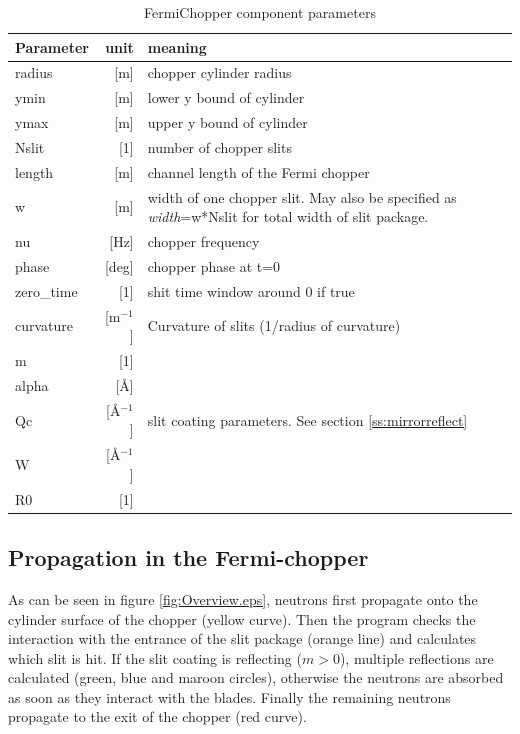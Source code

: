 \begin{table}
  \begin{center}
  {\let\my=\\
    \begin{tabular}{|lr|p{}|}
    \hline
Parameter & unit & meaning \\
    \hline
radius & [m] & chopper cylinder radius \\
ymin   & [m] &   lower y bound of cylinder \\
ymax   & [m] &   upper y bound of cylinder \\
Nslit  & [1] &   number of chopper slits \\
length & [m] &   channel length of the Fermi chopper \\
w      & [m] &   width of one chopper slit. May also be specified as \emph{width}=w*Nslit for total width of slit package. \\
nu & [Hz] &  chopper frequency \\
phase     & [deg] &   chopper phase at t=0 \\
zero\_time & [1] & shit time window around 0 if true \\
curvature & [m$^{-1}$] & Curvature of slits (1/radius of curvature) \\
    \hline
m     & [1] & \\
alpha & [\AA] & \\
Qc    & [\AA$^{-1}$] & slit coating parameters. See section \ref{ss:mirrorreflect} \\
W     & [\AA$^{-1}$] & \\
R0    & [1] & \\
    \hline
    \end{tabular}
    \caption{FermiChopper component parameters}
    \label{t:fc-param}
  }
  \end{center}
\end{table}


\subsection{Propagation in the Fermi-chopper}

As can be seen in figure \ref{fig:Overview.eps}, neutrons first propagate onto the cylinder surface of the chopper (yellow curve). Then the program checks the interaction with the entrance of the slit package (orange line) and calculates which slit is hit. If the slit coating is reflecting ($m > 0$), multiple reflections are calculated (green, blue and maroon circles), otherwise the neutrons are absorbed as soon as they interact with the blades. Finally the remaining neutrons propagate to the exit of the chopper (red curve).

